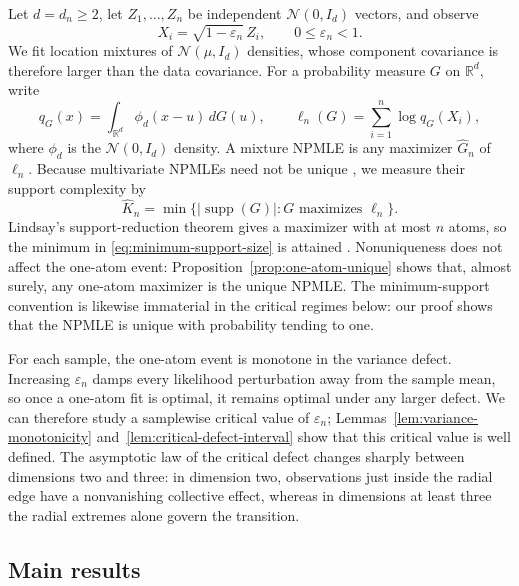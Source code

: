 \documentclass[11pt]{article}
\theoremstyle{remark}
\numberwithin{equation}{section}
\newcommand{\R}{\mathbb R}
\newcommand{\cN}{\mathcal N}
\newcommand{\eps}{\varepsilon}
\newcommand{\wh}{\widehat}
\DeclareMathOperator{\supp}{supp}
\begin{document}
Let $d=d_n\ge2$, let $Z_1,\ldots,Z_n$ be independent
$\cN(0,I_d)$ vectors, and observe
\begin{equation}
\label{eq:model}
    X_i=\sqrt{1-\eps_n}\,Z_i,
    \qquad 0\le\eps_n<1.
\end{equation}
We fit location mixtures of $\cN(\mu,I_d)$ densities, whose component
covariance is therefore larger than the data covariance. For a probability
measure $G$ on $\R^d$, write
\[
    q_G(x)=\int_{\R^d}\phi_d(x-u)\,dG(u),
    \qquad
    \ell_n(G)=\sum_{i=1}^n\log q_G(X_i),
\]
where $\phi_d$ is the $\cN(0,I_d)$ density. A mixture NPMLE is any maximizer
$\wh G_n$ of $\ell_n$. Because multivariate NPMLEs need not be unique
\cite{soloff2024multivariate}, we
measure their support complexity by
\begin{equation}
\label{eq:minimum-support-size}
    \wh K_n
    =\min\bigl\{|\supp(G)|:G\text{ maximizes }\ell_n\bigr\}.
\end{equation}
Lindsay's support-reduction theorem gives a maximizer with at most \(n\) atoms,
so the minimum in \eqref{eq:minimum-support-size} is attained
\cite{lindsay1983geometryA}. Nonuniqueness does not affect the one-atom event:
Proposition~\ref{prop:one-atom-unique} shows that, almost surely, any one-atom
maximizer is the unique NPMLE.  The minimum-support convention is likewise
immaterial in the critical regimes below: our proof shows that the NPMLE is
unique with probability tending to one.

For each sample, the one-atom event is monotone in the variance defect.
Increasing $\eps_n$ damps every likelihood perturbation away from the sample
mean, so once a one-atom fit is optimal, it remains optimal under any larger
defect. We can therefore study a samplewise critical value of $\eps_n$;
Lemmas~\ref{lem:variance-monotonicity}
and~\ref{lem:critical-defect-interval} show that this critical value is well
defined. The asymptotic law of the critical defect changes sharply between
dimensions two and three: in
dimension two, observations just inside the radial edge have a nonvanishing
collective effect, whereas in dimensions at least three the radial extremes
alone govern the transition.

\subsection{Main results}
\label{sec:intro-results}
\end{document}
